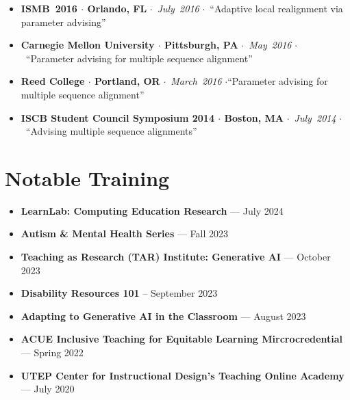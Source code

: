\documentclass[10pt,letterpaper]{article}
\newcommand{\bigdot}{$\cdot$\xspace}
\begin{document}
\begin{itemize}[leftmargin=*,labelindent=5pt,itemindent=-15pt]
    \item \textbf{ISMB~2016 \bigdot Orlando, FL} \bigdot~\textit{July~2016} \bigdot~``Adaptive local realignment via parameter advising'' 
    \item \textbf{Carnegie Mellon University \bigdot Pittsburgh, PA} \bigdot~\textit{May~2016} \bigdot~``Parameter advising for multiple sequence alignment''
    \item \textbf{Reed College \bigdot Portland, OR} \bigdot~\textit{March~2016} \bigdot ``Parameter advising for multiple sequence alignment''
    \item \textbf{ISCB Student Council Symposium 2014 \bigdot  Boston, MA} \bigdot~\textit{July~2014} \bigdot~``Advising multiple sequence alignments''
   
\end{itemize}

\section*{Notable Training}
\begin{itemize}
\item\textbf{LearnLab: Computing Education Research} --- July 2024
\item\textbf{Autism \& Mental Health Series} --- Fall 2023
\item\textbf{Teaching as Research (TAR) Institute: Generative AI} --- October 2023
\item\textbf{Disability Resources 101} -- September 2023
\item\textbf{Adapting to Generative AI in the Classroom} --- August 2023
\item\textbf{ACUE Inclusive Teaching for Equitable Learning Mircrocredential} --- Spring 2022 
\item\textbf{UTEP Center for Instructional Design's Teaching Online Academy} --- July 2020
\end{itemize}

\end{document}
